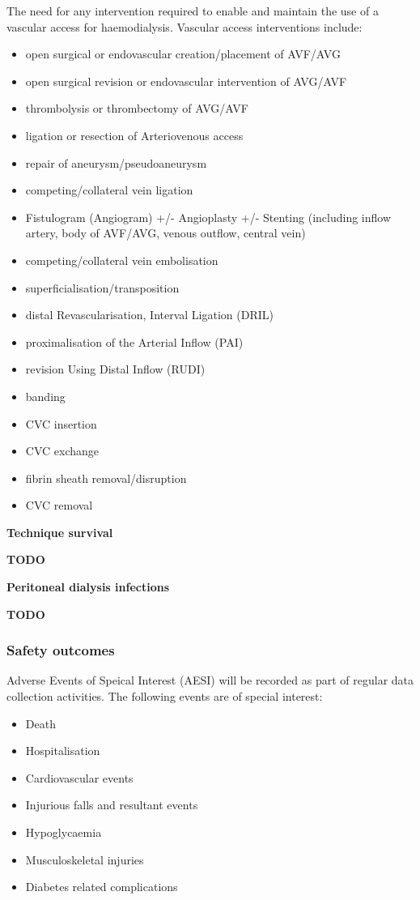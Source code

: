 \documentclass[11pt,parskip=half-]{scrartcl}
\providecommand{\tightlist}{%
  \setlength{\itemsep}{0pt}\setlength{\parskip}{0pt}}
\begin{document}
The need for any intervention required to enable and maintain the use of a vascular access for haemodialysis. Vascular access interventions include:
\begin{itemize}\tightlist
  \item open surgical or endovascular creation/placement of AVF/AVG
  \item open surgical revision or endovascular intervention of AVG/AVF
  \item thrombolysis or thrombectomy of AVG/AVF
  \item ligation or resection of Arteriovenous access
  \item repair of aneurysm/pseudoaneurysm
  \item competing/collateral vein ligation
  \item Fistulogram (Angiogram) +/- Angioplasty +/- Stenting (including inflow artery, body of AVF/AVG, venous outflow, central vein)
  \item competing/collateral vein embolisation
  \item superficialisation/transposition
  \item distal Revascularisation, Interval Ligation (DRIL)
  \item proximalisation of the Arterial Inflow (PAI)
  \item revision Using Distal Inflow (RUDI)
  \item banding
  \item CVC insertion
  \item CVC exchange
  \item fibrin sheath removal/disruption
  \item CVC removal
\end{itemize}

\textbf{Technique survival}

\textbf{TODO}

\textbf{Peritoneal dialysis infections}

\textbf{TODO}

\subsubsection{Safety outcomes}\label{safety-outcomes}

Adverse Events of Speical Interest (AESI) will be recorded as part of regular data collection activities. The following events are of special interest:
\begin{itemize}\tightlist
  \item Death
  \item Hospitalisation
  \item Cardiovascular events
  \item Injurious falls and resultant events
  \item Hypoglycaemia
  \item Musculoskeletal injuries
  \item Diabetes related complications
\end{itemize}
\end{document}
